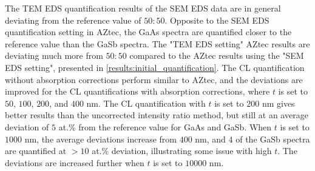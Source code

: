 The TEM EDS quantification results of the SEM EDS data are in general deviating from the reference value of $50:50$.
Opposite to the SEM EDS quantification setting in AZtec, the GaAs spectra are quantified closer to the reference value than the GaSb spectra.
The "TEM EDS setting" AZtec results are deviating much more from $50:50$ compared to the AZtec results using the "SEM EDS setting", presented in \cref{results:initial_quantification}.
The CL quantification without absorption corrections perform similar to AZtec, and the deviations are improved for the CL quantifications with absorption corrections, where $t$ is set to $50$, $100$, $200$, and $400$ nm.
The CL quantification with $t$ is set to $200$ nm gives better results than the uncorrected intensity ratio method, but still at an average deviation of $5$ at.\% from the reference value for GaAs and GaSb.
When $t$ is set to $1000$ nm, the average deviations increase from $400$ nm, and $4$ of the GaSb spectra are quantified at $> 10$ at.\% deviation, illustrating some issue with high $t$.
The deviations are increased further when $t$ is set to $10000$ nm.


